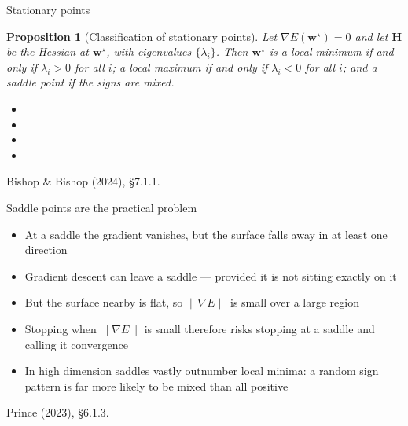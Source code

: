 \documentclass[aspectratio=169, 11pt]{beamer}
\newtheorem{propx}[theorem]{Proposition}
\newcommand{\srcline}[1]{%
  \par\vspace{0.25em}%
  {\scriptsize\color{mcMuted}\hfill #1\par}}
\newcommand{\src}[3]{}      %
\begin{document}
\begin{frame}{Stationary points}
  \src{bishop2024}{equation}{7.11-7.14}
  \src{bishop2024}{section}{7.1.1}
  \src{prince2023}{page}{92}
  \vspace{-0.2em}
  \begin{propx}[Classification of stationary points]\label{th:sig}
    \small
    Let $\nabla E(\mathbf{w}^\star) = 0$ and let $\mathbf{H}$ be the Hessian at $\mathbf{w}^\star$,
    with eigenvalues $\{\lambda_i\}$. Then $\mathbf{w}^\star$ is a local minimum
    if and only if $\lambda_i > 0$ for all $i$; a local maximum if and
    only if $\lambda_i < 0$ for all $i$; and a saddle point if the signs
    are mixed.
  \end{propx}
  \vspace{0.1em}
  {\footnotesize
  \begin{itemize}\itemsep0.28em
    \item {}
    \item {}
    \item {}
    \item {}
  \end{itemize}}
  \vspace{-0.3em}
  \srcline{Bishop \& Bishop (2024), \S7.1.1.}
\end{frame}

\begin{frame}{Saddle points are the practical problem}
  \src{prince2023}{section}{6.1.3}
  \vspace{0.3em}
  \begin{itemize}\itemsep0.45em
    \item At a saddle the gradient vanishes, but the surface falls away
          in at least one direction
    \item Gradient descent can leave a saddle --- provided it is not
          sitting exactly on it
    \item But the surface nearby is \alert{flat}, so
          $\|\nabla E\|$ is small over a large region
    \item Stopping when $\|\nabla E\|$ is small therefore risks stopping
          at a saddle and calling it convergence
    \item In high dimension saddles vastly outnumber local minima: a
          random sign pattern is far more likely to be mixed than all
          positive
  \end{itemize}
  \srcline{Prince (2023), \S6.1.3.}
\end{frame}
\end{document}
